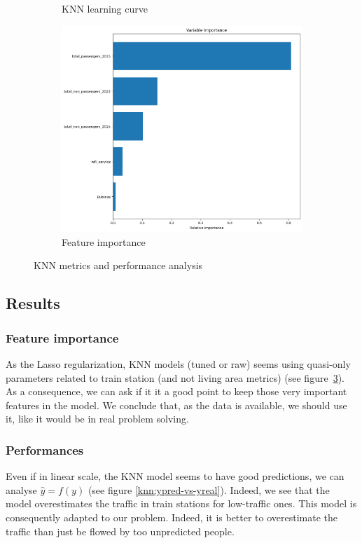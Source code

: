 \begin{figure}
\begin{subfigure}[b]{0.3\textwidth}
            \caption{KNN learning curve}
            \label{knn:learning-curve}
        \end{subfigure}
    \hfill
        \begin{subfigure}[b]{0.3\textwidth}
            \centering
            \includegraphics[width=\textwidth]{assets/images/knn-feature-importance.png}
            \caption{Feature importance}
            \label{knn:feature-importance}
        \end{subfigure}
    \caption{KNN metrics and performance analysis}
\end{figure}


\subsection{Results}
\subsubsection{Feature importance}
As the Lasso regularization, KNN models (tuned or raw) seems using quasi-only parameters related to train station (and not living area metrics) (see figure~\ref{knn:feature-importance}). As a consequence, we can ask if it it a good point to keep those very important features in the model. We conclude that, as the data is available, we should use it, like it would be in real problem solving.

\subsubsection{Performances}
Even if in linear scale, the KNN model seems to have good predictions, we can analyse $\hat{y}=f(y)$ (see figure \ref{knn:ypred-vs-yreal}). Indeed, we see that the model overestimates the traffic in train stations for low-traffic ones. This model is consequently adapted to our problem. Indeed, it is better to overestimate the traffic than just be flowed by too unpredicted people.

